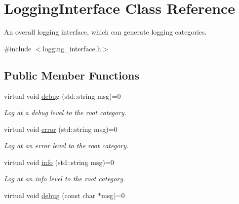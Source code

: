 \hypertarget{classLoggingInterface}{}\section{Logging\+Interface Class Reference}
\label{classLoggingInterface}


An overall logging interface, which can generate logging categories.  




{\ttfamily \#include $<$logging\+\_\+interface.\+h$>$}

\subsection*{Public Member Functions}
\begin{DoxyCompactItemize}
\item 
virtual void \hyperlink{classLoggingInterface_a94e666bf17b42a65c03aff86cbe04978}{debug} (std\+::string msg)=0\hypertarget{classLoggingInterface_a94e666bf17b42a65c03aff86cbe04978}{}\label{classLoggingInterface_a94e666bf17b42a65c03aff86cbe04978}

\begin{DoxyCompactList}\small\item\em Log at a debug level to the root category. \end{DoxyCompactList}\item 
virtual void \hyperlink{classLoggingInterface_a86ba6616c2163d8cb49bed70def8b862}{error} (std\+::string msg)=0\hypertarget{classLoggingInterface_a86ba6616c2163d8cb49bed70def8b862}{}\label{classLoggingInterface_a86ba6616c2163d8cb49bed70def8b862}

\begin{DoxyCompactList}\small\item\em Log at an error level to the root category. \end{DoxyCompactList}\item 
virtual void \hyperlink{classLoggingInterface_a5d994f7cfafe81171954409df64d77ce}{info} (std\+::string msg)=0\hypertarget{classLoggingInterface_a5d994f7cfafe81171954409df64d77ce}{}\label{classLoggingInterface_a5d994f7cfafe81171954409df64d77ce}

\begin{DoxyCompactList}\small\item\em Log at an info level to the root category. \end{DoxyCompactList}\item 
virtual void \hyperlink{classLoggingInterface_a82c2727fb66531d5eec19e39bed79671}{debug} (const char $\ast$msg)=0\hypertarget{classLoggingInterface_a82c2727fb66531d5eec19e39bed79671}{}\label{classLoggingInterface_a82c2727fb66531d5eec19e39bed79671}


\end{DoxyCompactItemize}
